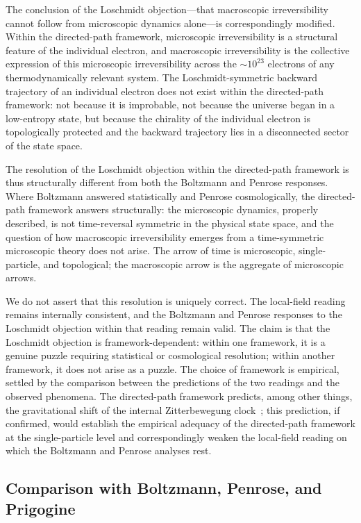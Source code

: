 \documentclass[%
 reprint, amsmath,amssymb, aps, prb, ]{revtex4-2}
\numberwithin{equation}{section}
\begin{document}
The conclusion of the Loschmidt objection---that macroscopic irreversibility cannot follow from microscopic dynamics alone---is correspondingly modified. Within the directed-path framework, microscopic irreversibility is a structural feature of the individual electron, and macroscopic irreversibility is the collective expression of this microscopic irreversibility across the $\sim 10^{23}$ electrons of any thermodynamically relevant system. The Loschmidt-symmetric backward trajectory of an individual electron does not exist within the directed-path framework: not because it is improbable, not because the universe began in a low-entropy state, but because the chirality of the individual electron is topologically protected and the backward trajectory lies in a disconnected sector of the state space.

The resolution of the Loschmidt objection within the directed-path framework is thus structurally different from both the Boltzmann and Penrose responses. Where Boltzmann answered statistically and Penrose cosmologically, the directed-path framework answers structurally: the microscopic dynamics, properly described, is not time-reversal symmetric in the physical state space, and the question of how macroscopic irreversibility emerges from a time-symmetric microscopic theory does not arise. The arrow of time is microscopic, single-particle, and topological; the macroscopic arrow is the aggregate of microscopic arrows.

We do not assert that this resolution is uniquely correct. The local-field reading remains internally consistent, and the Boltzmann and Penrose responses to the Loschmidt objection within that reading remain valid. The claim is that the Loschmidt objection is framework-dependent: within one framework, it is a genuine puzzle requiring statistical or cosmological resolution; within another framework, it does not arise as a puzzle. The choice of framework is empirical, settled by the comparison between the predictions of the two readings and the observed phenomena. The directed-path framework predicts, among other things, the gravitational shift of the internal Zitterbewegung clock~\cite{hanamura22, hanamura55}; this prediction, if confirmed, would establish the empirical adequacy of the directed-path framework at the single-particle level and correspondingly weaken the local-field reading on which the Boltzmann and Penrose analyses rest.

\subsection{Comparison with Boltzmann, Penrose, and Prigogine}
\label{sec:comparison_existing}
\end{document}
